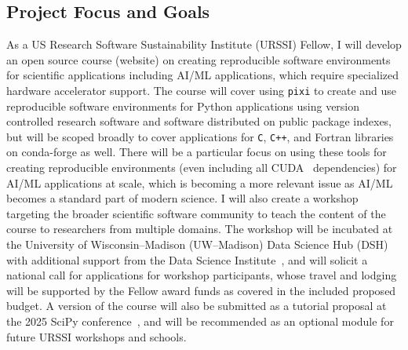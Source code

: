 \documentclass[letterpaper, 11pt]{article}
\newcommand{\institute}{UW--Madison}
\newcommand{\fullinstitute}{University of Wisconsin--Madison}
\newcommand{\fullprogram}{US Research Software Sustainability Institute}
\newcommand{\program}{URSSI}
\newcommand{\pixi}{\texttt{pixi}}
\begin{document}
\subsection{Project Focus and Goals}

As a \fullprogram{} (\program{}) Fellow, I will develop an open source course (website) on creating reproducible software environments for scientific applications including AI/ML applications, which require specialized hardware accelerator support.
The course will cover using \pixi{} to create and use reproducible software environments for Python applications using version controlled research software and software distributed on public package indexes, but will be scoped broadly to cover applications for \texttt{C}, \texttt{C++}, and Fortran libraries on conda-forge as well.
There will be a particular focus on using these tools for creating reproducible environments (even including all CUDA~\cite{CUDA_paper} dependencies) for AI/ML applications at scale, which is becoming a more relevant issue as AI/ML becomes a standard part of modern science.
I will also create a workshop targeting the broader scientific software community to teach the content of the course to researchers from multiple domains.
The workshop will be incubated at the \fullinstitute{} (\institute{}) Data Science Hub (DSH)~\cite{data_science_hub} with additional support from the Data Science Institute~\cite{uwmadison_dsi}, and will solicit a national call for applications for workshop participants, whose travel and lodging will be supported by the Fellow award funds as covered in the included proposed budget.
A version of the course will also be submitted as a tutorial proposal at the 2025 SciPy conference~\cite{scipy-2025}, and will be recommended as an optional module for future URSSI workshops and schools.
%
\end{document}
